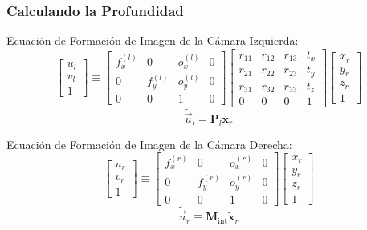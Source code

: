\begin{frame}
    \frametitle{Calculando la Profundidad}
    Ecuación de Formación de Imagen de la Cámara Izquierda:
    $$
    \begin{bmatrix} u_l \\ v_l \\ 1 \end{bmatrix} \equiv
    \begin{bmatrix}
        f_x^{(l)} & 0 & o_x^{(l)} & 0 \\
        0 & f_y^{(l)} & o_y^{(l)} & 0 \\
        0 & 0 & 1 & 0
    \end{bmatrix}
    \begin{bmatrix}
        r_{11} & r_{12} & r_{13} & t_x \\
        r_{21} & r_{22} & r_{23} & t_y \\
        r_{31} & r_{32} & r_{33} & t_z \\
        0 & 0 & 0 & 1
    \end{bmatrix}
    \begin{bmatrix} x_r \\ y_r \\ z_r \\ 1 \end{bmatrix}
    $$
    $$\boxed{\tilde{\vec{u}}_l = \mathbf{P}_l \tilde{\mathbf{x}}_r}$$

    Ecuación de Formación de Imagen de la Cámara Derecha:
    $$
    \begin{bmatrix} u_r \\ v_r \\ 1 \end{bmatrix} \equiv
    \begin{bmatrix}
        f_x^{(r)} & 0 & o_x^{(r)} & 0 \\
        0 & f_y^{(r)} & o_y^{(r)} & 0 \\
        0 & 0 & 1 & 0
    \end{bmatrix}
    \begin{bmatrix} x_r \\ y_r \\ z_r \\ 1 \end{bmatrix}
    $$
    $$\boxed{\tilde{\vec{u}}_r \equiv \mathbf{M}_{\text{int}} \tilde{\mathbf{x}}_r}$$
\end{frame}


